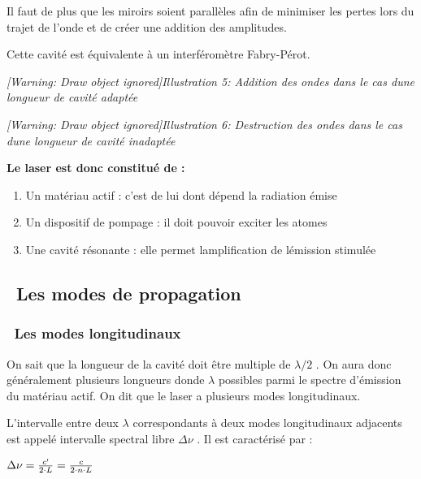 \documentclass[12pt,twoside]{article}
\newcommand\liststyleLvi{%
\renewcommand\labelitemi{[25CF?]}
\renewcommand\labelitemii{[25CB?]}
\renewcommand\labelitemiii{[25A0?]}
\renewcommand\labelitemiv{[25CF?]}
}
\begin{document}
\bigskip

Il faut de plus que les miroirs soient parall\`eles afin de minimiser
les pertes lors du trajet de l'onde et de cr\'eer une addition des
amplitudes.

Cette cavit\'e est \'equivalente \`a un interf\'erom\`etre
Fabry{}-P\'erot.

\begin{minipage}{15.253cm}
{\itshape
[Warning: Draw object ignored]Illustration 5: Addition des ondes dans le
cas d{\textquotesingle}une longueur de cavit\'e adapt\'ee}
\end{minipage}

\begin{minipage}{15.253cm}
{\itshape
[Warning: Draw object ignored]Illustration 6: Destruction des ondes dans
le cas d{\textquotesingle}une longueur de cavit\'e inadapt\'ee}
\end{minipage}

{\bfseries
Le laser est donc constitu\'e de :}

\liststyleLvi
\begin{enumerate}
\item Un mat\'eriau actif : c'est de lui dont d\'epend la radiation
\'emise
\item Un dispositif de pompage : il doit pouvoir exciter les atomes
\item Une cavit\'e r\'esonante : elle permet
l{\textquotesingle}amplification de l{\textquotesingle}\'emission
stimul\'ee
\end{enumerate}
\subsection[\ Les modes de propagation]{\ Les modes de propagation}
\subsubsection[\ Les modes longitudinaux ]{\ Les modes longitudinaux }
On sait que la longueur de la cavit\'e doit \^etre multiple de $\lambda
/2$ . On aura donc g\'en\'eralement plusieurs longueurs
d{\textquotesingle}onde $\lambda $ possibles parmi le spectre
d'\'emission du mat\'eriau actif. On dit que le laser a plusieurs modes
longitudinaux. 

L'intervalle entre deux $\lambda $ correspondants \`a deux modes
longitudinaux adjacents est appel\'e intervalle spectral libre $\Delta
\nu $ . Il est caract\'eris\'e par :

{\centering
 $\Delta \nu =\frac{c\text{{\textquotesingle}}}{2\cdot
L}=\frac{c}{2\cdot n\cdot L}$ 
\par}
\end{document}
